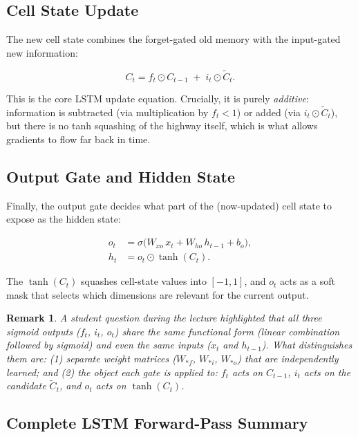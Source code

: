 \documentclass[12pt,a4paper]{article}
\newtheorem{remark}{Remark}[section]
\begin{document}
\subsection{Cell State Update}
\label{subsec:cell-update}

The new cell state combines the forget-gated old memory with the input-gated
new information:

\begin{equation}
  \boxed{C_t = f_t \odot C_{t-1} \;+\; i_t \odot \tilde{C}_t.}
  \label{eq:cell-update}
\end{equation}

This is the core LSTM update equation.  Crucially, it is purely
\emph{additive}: information is subtracted (via multiplication by $f_t < 1$)
or added (via $i_t \odot \tilde{C}_t$), but there is no tanh squashing of the
highway itself, which is what allows gradients to flow far back in time.

\subsection{Output Gate and Hidden State}
\label{subsec:output-gate}

Finally, the output gate decides what part of the (now-updated) cell state
to expose as the hidden state:

\begin{align}
  o_t &= \sigma\!\bigl(W_{xo}\,x_t + W_{ho}\,h_{t-1} + b_o\bigr),
         \label{eq:ot} \\
  h_t &= o_t \odot \tanh(C_t).
         \label{eq:ht}
\end{align}

The $\tanh(C_t)$ squashes cell-state values into $[-1,1]$, and $o_t$ acts as
a soft mask that selects which dimensions are relevant for the current output.

\begin{remark}
  A student question during the lecture highlighted that all three sigmoid
  outputs ($f_t$, $i_t$, $o_t$) share the same functional form
  (linear combination followed by sigmoid) and even the same inputs
  ($x_t$ and $h_{t-1}$).  What distinguishes them are:
  (1) separate weight matrices ($W_{*f}$, $W_{*i}$, $W_{*o}$) that are
  independently learned; and
  (2) the object each gate is \emph{applied to}: $f_t$ acts on $C_{t-1}$,
  $i_t$ acts on the candidate $\tilde{C}_t$, and $o_t$ acts on $\tanh(C_t)$.
\end{remark}

\subsection{Complete LSTM Forward-Pass Summary}
\label{subsec:full-pass}
\end{document}
